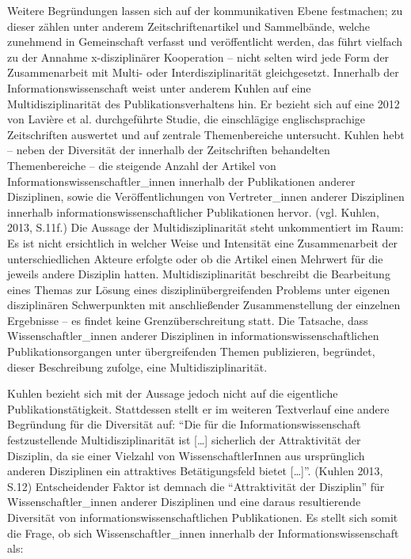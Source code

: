 \documentclass[a4paper,
fontsize=11pt,
oneside,
numbers=noperiodatend,
parskip=half-,
bibliography=totoc,
final
]{scrartcl}
\begin{document}
Weitere Begründungen lassen sich auf der kommunikativen Ebene
festmachen; zu dieser zählen unter anderem Zeitschriftenartikel und
Sammelbände, welche zunehmend in Gemeinschaft verfasst und
veröffentlicht werden, das führt vielfach zu der Annahme x-disziplinärer
Kooperation -- nicht selten wird jede Form der Zusammenarbeit mit Multi-
oder Interdisziplinarität gleichgesetzt. Innerhalb der
Informationswissenschaft weist unter anderem Kuhlen auf eine
Multidisziplinarität des Publikationsverhaltens hin. Er bezieht sich auf
eine 2012 von Lavière et al. durchgeführte Studie, die einschlägige
englischsprachige Zeitschriften auswertet und auf zentrale
Themenbereiche untersucht. Kuhlen hebt -- neben der Diversität der
innerhalb der Zeitschriften behandelten Themenbereiche -- die steigende
Anzahl der Artikel von Informationswissenschaftler\_innen innerhalb der
Publikationen anderer Disziplinen, sowie die Veröffentlichungen von
Vertreter\_innen anderer Disziplinen innerhalb
informationswissenschaftlicher Publikationen hervor. (vgl. Kuhlen, 2013,
S.11f.) Die Aussage der Multidisziplinarität steht unkommentiert im
Raum: Es ist nicht ersichtlich in welcher Weise und Intensität eine
Zusammenarbeit der unterschiedlichen Akteure erfolgte oder ob die
Artikel einen Mehrwert für die jeweils andere Disziplin hatten.
Multidisziplinarität beschreibt die Bearbeitung eines Themas zur Lösung
eines disziplinübergreifenden Problems unter eigenen disziplinären
Schwerpunkten mit anschließender Zusammenstellung der einzelnen
Ergebnisse -- es findet keine Grenzüberschreitung statt. Die Tatsache,
dass Wissenschaftler\_innen anderer Disziplinen in
informationswissenschaftlichen Publikationsorgangen unter übergreifenden
Themen publizieren, begründet, dieser Beschreibung zufolge, eine
Multidisziplinarität.

Kuhlen bezieht sich mit der Aussage jedoch nicht auf die eigentliche
Publikationstätigkeit. Stattdessen stellt er im weiteren Textverlauf
eine andere Begründung für die Diversität auf: \enquote{Die für die
Informationswissenschaft festzustellende Multidisziplinarität ist
{[}\ldots{}{]} sicherlich der Attraktivität der Disziplin, da sie einer
Vielzahl von WissenschaftlerInnen aus ursprünglich anderen Disziplinen
ein attraktives Betätigungsfeld bietet {[}\ldots{}{]}}. (Kuhlen 2013,
S.12) Entscheidender Faktor ist demnach die \enquote{Attraktivität der
Disziplin} für Wissenschaftler\_innen anderer Disziplinen und eine
daraus resultierende Diversität von informationswissenschaftlichen
Publikationen. Es stellt sich somit die Frage, ob sich
Wissenschaftler\_innen innerhalb der Informationswissenschaft als:
\end{document}
